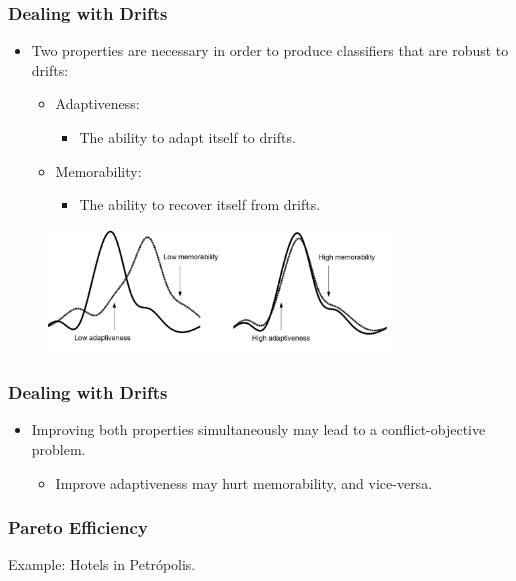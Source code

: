 \documentclass[14pt]{beamer}
\begin{document}
\begin{frame}\frametitle{Dealing with Drifts}

\begin{itemize}
\item Two properties are necessary in order to produce classifiers that are robust to drifts:
\begin{itemize}
\item Adaptiveness:
\begin{itemize}
\item The ability to adapt itself to drifts.
\end{itemize}
\item Memorability:
\begin{itemize}
\item The ability to recover itself from drifts.
\end{itemize}
\end{itemize}
\end{itemize}

\begin{figure}
\centering
\includegraphics[height=1.30in]{drift3}
\end{figure}
\end{frame}

\begin{frame}\frametitle{Dealing with Drifts}

\begin{itemize}
\item Improving both properties simultaneously may lead to a conflict-objective problem.
\begin{itemize}
\item Improve adaptiveness may hurt memorability, and vice-versa.
\end{itemize}
\end{itemize}

\end{frame}


\begin{frame}\frametitle{Pareto Efficiency}

Example: Hotels in Petr\'{o}polis.

\centering


\end{frame}
\end{document}

